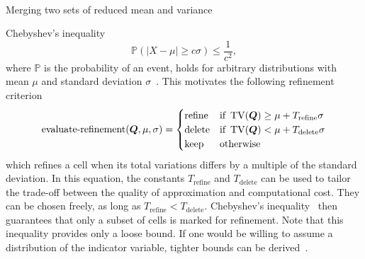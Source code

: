 \begin{algorithm}[tb]
  \begin{algorithmic}
  \State{}
\EndIf\
  \State{}
\EndIf\
  \Let{$m_b$}{$\variance_1 (\gobsCount_1 - 1)$}
  \State\Return{$
    \nicefrac{\mean_\Sigma}{\gobsCount_\Sigma},
    \nicefrac{m_\text{total}}{\gobsCount_\Sigma - 1},
    \gobsCount_\Sigma
    $}
\EndFunction\
  \end{algorithmic}
  \caption{\label{alg:merge-variance}
    Merging two sets of reduced mean and variance~\cite{chan1982updating}}
\end{algorithm}
Chebyshev's inequality
\begin{equation}
  \label{eq:chebychev}
  \mathbb{P}(\vert X - \mu \vert \geq c \sigma) \leq \frac{1}{c^2},
\end{equation}
where $\mathbb{P}$ is the probability of an event,
holds for arbitrary distributions with mean $\mu$ and standard deviation $\sigma$~\cite{wasserman2004all}.
This motivates the following refinement criterion
\begin{equation}
  \label{eq:refinement-criterion}
  \operatorname{evaluate-refinement}(\bm{Q}, \mu, \sigma) =
  \begin{cases}
    \text{refine} & \text{if } \operatorname{TV}(\bm{Q}) \geq \mu + T_\text{refine} \sigma \\
    \text{delete} & \text{if } \operatorname{TV}(\bm{Q}) < \mu + T_\text{delete} \sigma \\
    \text{keep} & \text{otherwise}
    \end{cases}
\end{equation}
which refines a cell when its total variations differs by a multiple of the standard deviation.
In this equation, the constants $T_\text{refine}$ and $T_\text{delete}$ can be used to tailor the trade-off between the quality of approximation and computational cost.
They can be chosen freely, as long as $T_\text{refine} < T_\text{delete}$.
Chebyshev's inequality~\pcref{eq:chebychev} then guarantees that only a subset of cells is marked for refinement.
Note that this inequality provides only a loose bound.
If one would be willing to assume a distribution of the indicator variable, tighter bounds can be derived~\cite{wasserman2004all}.

